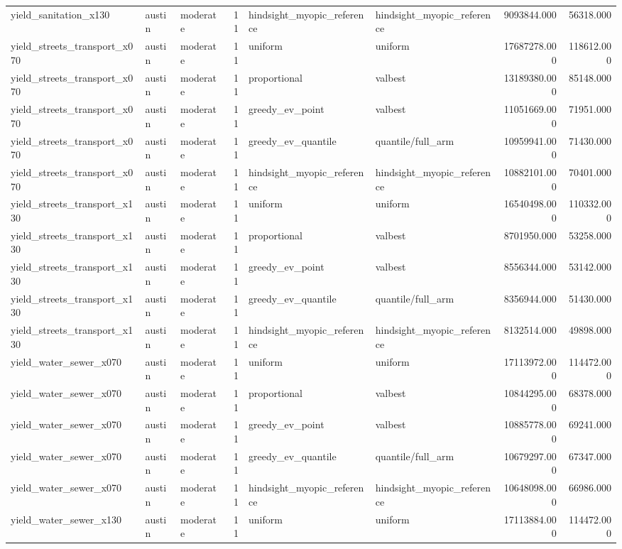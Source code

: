 \begin{tabular}{lllrllrr}
yield\_sanitation\_x130 & austin & moderate & 11 & hindsight\_myopic\_reference & hindsight\_myopic\_reference & 9093844.000 & 56318.000 \\
yield\_streets\_transport\_x070 & austin & moderate & 11 & uniform & uniform & 17687278.000 & 118612.000 \\
yield\_streets\_transport\_x070 & austin & moderate & 11 & proportional & valbest & 13189380.000 & 85148.000 \\
yield\_streets\_transport\_x070 & austin & moderate & 11 & greedy\_ev\_point & valbest & 11051669.000 & 71951.000 \\
yield\_streets\_transport\_x070 & austin & moderate & 11 & greedy\_ev\_quantile & quantile/full\_arm & 10959941.000 & 71430.000 \\
yield\_streets\_transport\_x070 & austin & moderate & 11 & hindsight\_myopic\_reference & hindsight\_myopic\_reference & 10882101.000 & 70401.000 \\
yield\_streets\_transport\_x130 & austin & moderate & 11 & uniform & uniform & 16540498.000 & 110332.000 \\
yield\_streets\_transport\_x130 & austin & moderate & 11 & proportional & valbest & 8701950.000 & 53258.000 \\
yield\_streets\_transport\_x130 & austin & moderate & 11 & greedy\_ev\_point & valbest & 8556344.000 & 53142.000 \\
yield\_streets\_transport\_x130 & austin & moderate & 11 & greedy\_ev\_quantile & quantile/full\_arm & 8356944.000 & 51430.000 \\
yield\_streets\_transport\_x130 & austin & moderate & 11 & hindsight\_myopic\_reference & hindsight\_myopic\_reference & 8132514.000 & 49898.000 \\
yield\_water\_sewer\_x070 & austin & moderate & 11 & uniform & uniform & 17113972.000 & 114472.000 \\
yield\_water\_sewer\_x070 & austin & moderate & 11 & proportional & valbest & 10844295.000 & 68378.000 \\
yield\_water\_sewer\_x070 & austin & moderate & 11 & greedy\_ev\_point & valbest & 10885778.000 & 69241.000 \\
yield\_water\_sewer\_x070 & austin & moderate & 11 & greedy\_ev\_quantile & quantile/full\_arm & 10679297.000 & 67347.000 \\
yield\_water\_sewer\_x070 & austin & moderate & 11 & hindsight\_myopic\_reference & hindsight\_myopic\_reference & 10648098.000 & 66986.000 \\
yield\_water\_sewer\_x130 & austin & moderate & 11 & uniform & uniform & 17113884.000 & 114472.000 \\

\end{tabular}
